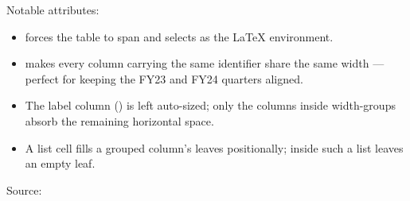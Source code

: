 \documentclass[a4paper,twoside]{article}
\begin{document}
Notable attributes:
\begin{itemize}
\item {} forces the table to span  and selects
 as the \LaTeX{} environment.
\item {} makes every column carrying the same identifier share
the same width --- perfect for keeping the FY23 and FY24 quarters aligned.
\item The label column () is left auto-sized; only the columns inside
width-groups absorb the remaining horizontal space.
\item A list cell \tscodeinline{[120, 135, 150, 140]} fills a grouped column's leaves
positionally; \tscodeinline{\textasciitilde{}} inside such a list leaves an empty leaf.
\end{itemize}
Source:
\end{document}
